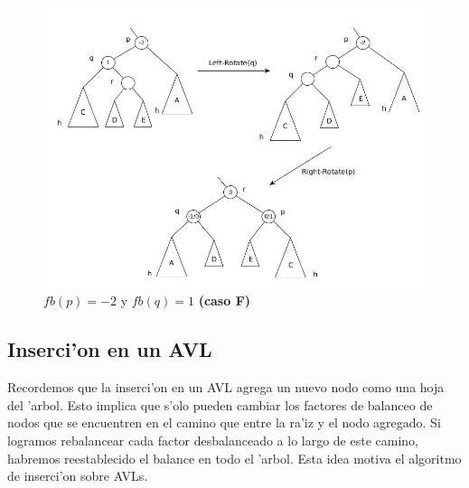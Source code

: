 \begin{figure}[H]
	\begin{center}
		\includegraphics[scale=0.55]{imagenes/fig16.jpg}
	\end{center}
	\caption{$fb(p) = -2$ y $fb(q) = 1$ \textbf{(caso F)}}
	\label{fig16}
\end{figure}

\subsection{Inserci'on en un AVL}

Recordemos que la inserci'on en un AVL agrega un nuevo nodo como una hoja del 'arbol. Esto implica que s'olo pueden cambiar los factores de balanceo de nodos que se encuentren en el camino que entre la ra'iz y el nodo agregado. Si logramos rebalancear cada factor desbalanceado a lo largo de este camino, habremos reestablecido el balance en todo el 'arbol. Esta idea motiva el algoritmo de inserci'on sobre AVLs.


\begin{algorithm}
  	\DontPrintSemicolon
\end{algorithm}


\begin{algorithm}
  	\DontPrintSemicolon
\end{algorithm}

